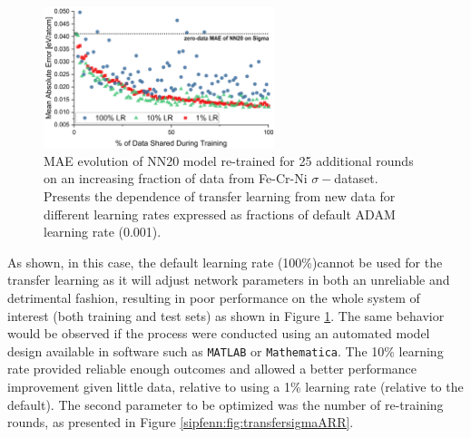 \begin{figure}[H]
    \centering
    \includegraphics[width=0.6\textwidth]{sipfenn/transferLearning_MAE_vs_LearningRate.png}
    \caption{MAE evolution of NN20 model re-trained for 25 additional rounds on an increasing fraction of data from Fe-Cr-Ni $\sigma-$dataset. Presents the dependence of transfer learning from new data for different learning rates expressed as fractions of default ADAM learning rate (0.001).}
    \vspace{-12pt}
    \label{sipfenn:fig:transfersigmaLR}
\end{figure}

As shown, in this case, the default learning rate (100\%)cannot be used for the transfer learning as it will adjust network parameters in both an unreliable and detrimental fashion, resulting in poor performance on the whole system of interest (both training and test sets) as shown in Figure \ref{sipfenn:fig:transfersigmaLR}. The same behavior would be observed if the process were conducted using an automated model design available in software such as \texttt{MATLAB} or \texttt{Mathematica}. The 10\% learning rate provided reliable enough outcomes and allowed a better performance improvement given little data, relative to using a 1\% learning rate (relative to the default). The second parameter to be optimized was the number of re-training rounds, as presented in Figure \ref{sipfenn:fig:transfersigmaARR}.

